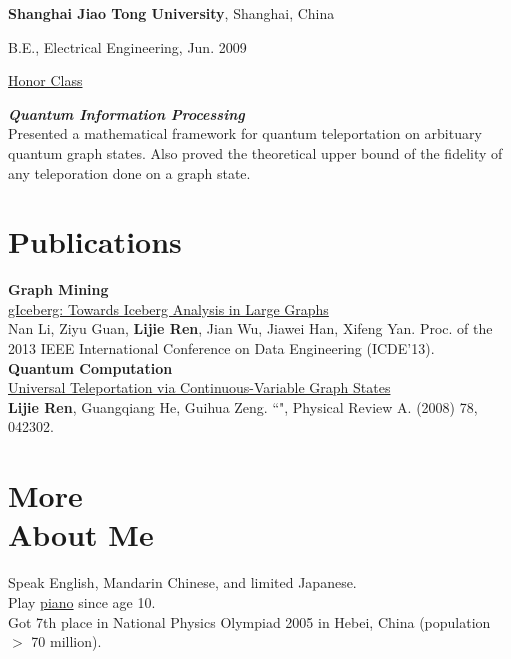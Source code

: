 \documentclass[margin,line]{res}
\newenvironment{list1}{
  \begin{list}{\ding{113}}{%
      \setlength{\itemsep}{0in}
      \setlength{\parsep}{0in} \setlength{\parskip}{0in}
      \setlength{\topsep}{0in} \setlength{\partopsep}{0in}
      \setlength{\leftmargin}{0.17in}}}{\end{list}}
\begin{document}
\begin{resume}
{\bf Shanghai Jiao Tong University}, Shanghai, China\\
\vspace*{-.1in}
\begin{list1}
\item[] B.E., Electrical Engineering, Jun. 2009
\item[] \href{https://drive.google.com/open?id=16OkB9044sx22P3BQwLKHNrZMnmeHmUoZ}{Honor Class}
\end{list1}

\vspace*{-.1in}
{\bf{\em Quantum Information Processing}}\\
Presented a mathematical framework for quantum teleportation on arbituary quantum graph states. Also proved the theoretical upper bound of the fidelity of any teleporation done on a graph state.

\section{\sc Publications}
\vspace{-.1in}
{\bf Graph Mining}\\
\href{https://drive.google.com/open?id=1TMkCJGdvBT6-96O487QWsjsFdTMqDxQT}{gIceberg: Towards Iceberg Analysis in Large Graphs}\\
Nan Li, Ziyu Guan, {\bf{Lijie Ren}}, Jian Wu, Jiawei Han, Xifeng Yan. Proc. of the 2013 IEEE International Conference on Data Engineering (ICDE'13).\\

\vspace*{-.1in}
{\bf Quantum Computation}\\
\href{https://drive.google.com/open?id=16mw5QziHqvVJCKmDTiCaopSsf2f-zJYy}{Universal Teleportation via Continuous-Variable Graph States}\\
{\bf{Lijie Ren}}, Guangqiang He, Guihua Zeng. ``", Physical Review A. (2008) 78, 042302.\\

\vspace{-.1in}

\section{\sc More \\About Me}
Speak English, Mandarin Chinese, and limited Japanese.\\
Play \href{https://soundcloud.com/lijie-ren}{piano} since age 10.\\
Got 7th place in National Physics Olympiad 2005 in Hebei, China (population $>$ 70 million).

\end{resume}
\end{document}
